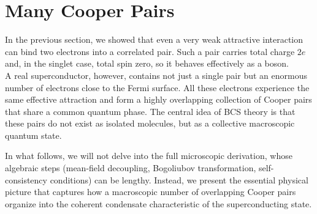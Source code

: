 \section{Many Cooper Pairs}

In the previous section, we showed that even a very weak attractive interaction can bind two electrons into a correlated pair.  
Such a pair carries total charge \(2e\) and, in the singlet case, total spin zero, so it behaves effectively as a boson.\\
A real superconductor, however, contains not just a single pair but an enormous number of electrons close to the Fermi surface.  
All these electrons experience the same effective attraction and form a highly overlapping collection of Cooper pairs that share a common quantum phase.  
The central idea of BCS theory is that these pairs do not exist as isolated molecules, but as a collective macroscopic quantum state.

In what follows, we will not delve into the full microscopic derivation, whose algebraic steps (mean-field decoupling, Bogoliubov transformation, self-consistency conditions) can be lengthy.
Instead, we present the essential physical picture that captures how a macroscopic number of overlapping Cooper pairs organize into the coherent condensate characteristic of the superconducting state.

